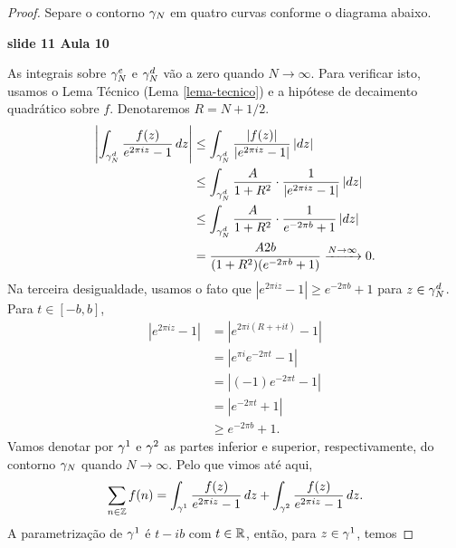 \begin{proof}
            Separe o contorno $\gamma_N$ em quatro curvas conforme o diagrama abaixo. 
            \begin{center}
                {\bf slide 11 Aula 10}
            \end{center}
            As integrais sobre
            $\gamma_N^e$ e $\gamma_N^d$ vão a zero quando $N \to \infty$. Para verificar isto, usamos o 
            Lema Técnico (Lema \ref{lema-tecnico}) e a hipótese de decaimento quadrático sobre $f$. 
            Denotaremos $R = N + 1/2$.
            \begin{align*}
                \left |\int_{\gamma_N^d} \frac{f(z)}{e^{2 \pi i z} - 1}\,dz\right| 
                &\leq \int_{\gamma_N^d} \frac{|f(z)|}{|e^{2 \pi i z} - 1|}\,|dz| \\
                &\leq \int_{\gamma_N^d} \frac{A}{1 + R^2}\cdot\frac{1}{|e^{2 \pi i z} - 1|}\,|dz| \\
                &\leq \int_{\gamma_N^d} \frac{A}{1 + R^2}\cdot\frac{1}{e^{-2\pi b} + 1}\,|dz| \\
                & = \frac{A2b}{(1 + R^2)(e^{-2\pi b} + 1)} \xrightarrow{N \to \infty} 0.
            \end{align*}
            Na terceira desigualdade, usamos o fato que $|e^{2\pi i z} - 1| \geq e^{-2 \pi b} + 1$ 
            para $z \in \gamma_N^d$. Para $t \in [-b,b]$,
            \begin{align*}
                |e^{2 \pi i z} - 1| &= |e^{2 \pi i(R+ + i t)} - 1| \\
                &= |e^{\pi i}e^{-2\pi t} - 1| \\
                & = |(-1)e^{-2\pi t} - 1| \\
                &= |e^{-2\pi t} + 1| \\
                &\geq e^{-2\pi b} + 1.
            \end{align*}
            Vamos denotar por $\gamma^1$ e $\gamma^2$ as partes inferior e superior, respectivamente, 
            do contorno $\gamma_N$ quando $N \to \infty$. Pelo que vimos até aqui,
            \begin{equation*}
                \sum_{n \in \mathbb{Z}}f(n) = \int_{\gamma^1}\frac{f(z)}{e^{2\pi i z} - 1}\,dz 
                                    + \int_{\gamma^2}\frac{f(z)}{e^{2\pi i z} - 1}\,dz.
            \end{equation*}
            A parametrização de $\gamma^1$ é $t - ib$ com $t \in \mathbb{R}$, então, para $z \in \gamma^1$, 
            temos 

\end{proof}
